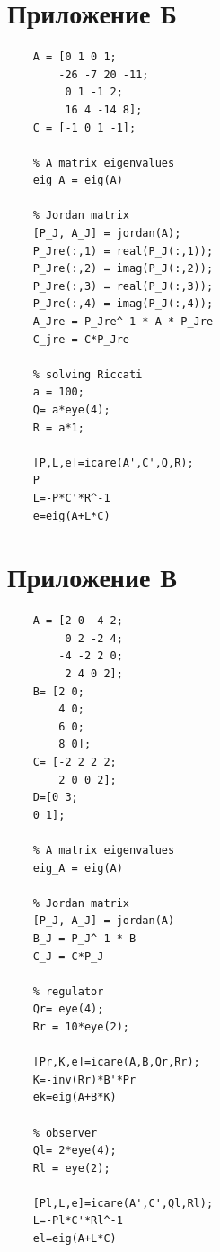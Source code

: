 \documentclass[a4paper, 12pt]{article}
\begin{document}
    \section{Приложение Б}
    \begin{lstlisting}[label=task2, caption={Программа для задания 2}]
    % plant parameters
    A = [0 1 0 1;
        -26 -7 20 -11;
         0 1 -1 2;
         16 4 -14 8];
    C = [-1 0 1 -1];

    % A matrix eigenvalues
    eig_A = eig(A)

    % Jordan matrix
    [P_J, A_J] = jordan(A);
    P_Jre(:,1) = real(P_J(:,1));
    P_Jre(:,2) = imag(P_J(:,2));
    P_Jre(:,3) = real(P_J(:,3));
    P_Jre(:,4) = imag(P_J(:,4));
    A_Jre = P_Jre^-1 * A * P_Jre
    C_jre = C*P_Jre

    % solving Riccati
    a = 100;
    Q= a*eye(4);
    R = a*1;

    [P,L,e]=icare(A',C',Q,R);
    P
    L=-P*C'*R^-1
    e=eig(A+L*C)
    \end{lstlisting}


    \section{Приложение В}
    \begin{lstlisting}[label=task3, caption={Программа для задания 3}]
    % plant parameters
    A = [2 0 -4 2;
         0 2 -2 4;
        -4 -2 2 0;
         2 4 0 2];
    B= [2 0;
        4 0;
        6 0;
        8 0];
    C= [-2 2 2 2;
        2 0 0 2];
    D=[0 3;
    0 1];

    % A matrix eigenvalues
    eig_A = eig(A)

    % Jordan matrix
    [P_J, A_J] = jordan(A)
    B_J = P_J^-1 * B
    C_J = C*P_J

    % regulator
    Qr= eye(4);
    Rr = 10*eye(2);

    [Pr,K,e]=icare(A,B,Qr,Rr);
    K=-inv(Rr)*B'*Pr
    ek=eig(A+B*K)

    % observer
    Ql= 2*eye(4);
    Rl = eye(2);

    [Pl,L,e]=icare(A',C',Ql,Rl);
    L=-Pl*C'*Rl^-1
    el=eig(A+L*C)
    \end{lstlisting}
\end{document}
